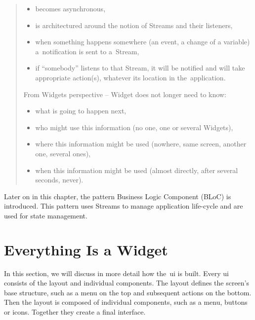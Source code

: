 \begin{quote}
    \begin{itemize}
        \item becomes asynchronous,
        \item is architectured around the notion of Streams and their listeners,
        \item when something happens somewhere (an event, a change of a variable) a~notification is sent to a~Stream,
        \item if ``somebody'' listens to that Stream, it will be notified and will take appropriate action(s), whatever its location in the~application.
    \end{itemize}
    
    From Widgets perspective -- Widget does not longer need to know:
    
    \begin{itemize}
        \item what is going to happen next,
        \item who might use this information (no one, one or several Widgets),
        \item where this information might be used (nowhere, same screen, another one, several ones),
        \item when this information might be used (almost directly, after several seconds, never).
    \end{itemize}
\end{quote}

Later on in this chapter, the pattern Business Logic Component (BLoC) is introduced. This pattern uses Streams to manage application life-cycle and are used for state management.
\section{Everything Is a Widget}
In this section, we will discuss in more detail how the~\gls{ui} is built. Every \gls{ui} consists of the layout and individual components. The layout defines the screen's base structure, such as a menu on the top and subsequent actions on the bottom. Then the layout is composed of individual components, such as a menu, buttons or icons. Together they create a final interface.

